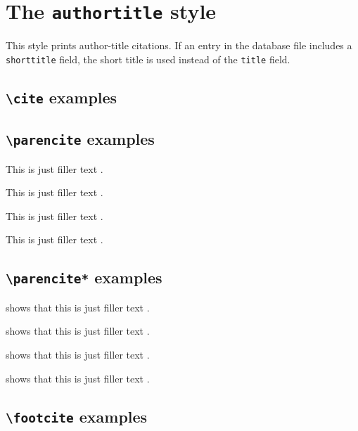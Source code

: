\documentclass[a4paper]{article}
\newcommand{\cmd}[1]{\texttt{\textbackslash #1}}
\begin{document}
\section*{The \texttt{authortitle} style}

This style prints author-title citations. If an entry in the
database file includes a \texttt{shorttitle} field, the short
title is used instead of the \texttt{title} field.

\subsection*{\cmd{cite} examples}

\cite{aristotle:rhetoric}

\cite[59]{aristotle:rhetoric}

\cite[See][]{aristotle:rhetoric}

\cite[See][59--63]{aristotle:rhetoric}

\subsection*{\cmd{parencite} examples}

This is just filler text \parencite{aristotle:rhetoric}.

This is just filler text \parencite[59]{aristotle:rhetoric}.

This is just filler text \parencite[See][]{aristotle:rhetoric}.

This is just filler text \parencite[See][59--63]{aristotle:rhetoric}.

\subsection*{\cmd{parencite*} examples}

\citeauthor{aristotle:rhetoric} shows that this is just filler
text \parencite*{aristotle:rhetoric}.

\citeauthor{aristotle:rhetoric} shows that this is just filler
text \parencite*[59]{aristotle:rhetoric}.

\citeauthor{aristotle:rhetoric} shows that this is just filler
text \parencite*[See][]{aristotle:rhetoric}.

\citeauthor{aristotle:rhetoric} shows that this is just filler
text \parencite*[See][59--63]{aristotle:rhetoric}.

\subsection*{\cmd{footcite} examples}
\end{document}
